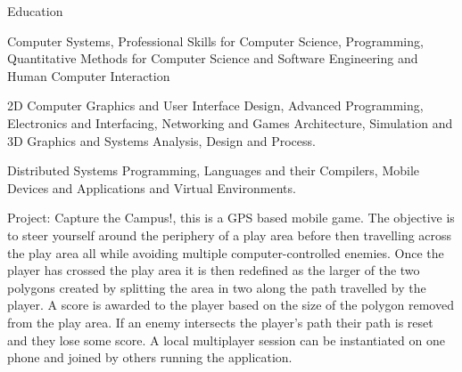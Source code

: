 \documentclass{cv}
\begin{document}
\begin{rSection}{Education}
        \item Computer Systems, Professional Skills for Computer Science, Programming, Quantitative Methods for Computer Science and Software Engineering and Human Computer Interaction
        
        \item 2D Computer Graphics and User Interface Design, Advanced Programming, Electronics and Interfacing, Networking and Games Architecture, Simulation and 3D Graphics and Systems Analysis, Design and Process.
        
        \item Distributed Systems Programming, Languages and their Compilers, Mobile Devices and Applications and Virtual Environments.
        
        \item Project: Capture the Campus!, this is a GPS based mobile game. The objective is to steer yourself around the periphery of a play area before then travelling across the play area all while avoiding multiple computer-controlled enemies. Once the player has crossed the play area it is then redefined as the larger of the two polygons created by splitting the area in two along the path travelled by the player. A score is awarded to the player based on the size of the polygon removed from the play area. If an enemy intersects the player’s path their path is reset and they lose some score. A local multiplayer session can be instantiated on one phone and joined by others running the application.
    \end{rSection}
    
\end{document}
